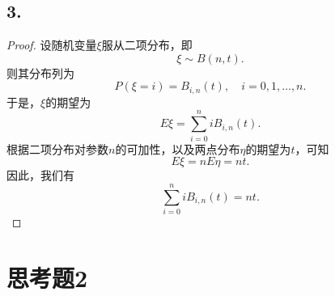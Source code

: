 \documentclass[utf8]{ctexart}
\begin{document}
\subsection*{3.}
\begin{proof}
    设随机变量$\xi$服从二项分布，即
$$
\xi\sim B(n,t).
$$
则其分布列为
$$
P(\xi = i) = B_{i,n}(t),\quad i = 0,1,\dots,n.
$$
于是，$\xi$的期望为
$$
E\xi = \sum_{i=0}^niB_{i,n}(t).
$$
根据二项分布对参数$n$的可加性，以及两点分布$\eta$的期望为$t$，可知
$$
E\xi = nE\eta = nt.
$$
因此，我们有
$$
\sum_{i=0}^niB_{i,n}(t) = nt.
$$
\end{proof}

\section*{思考题2}
\end{document}
